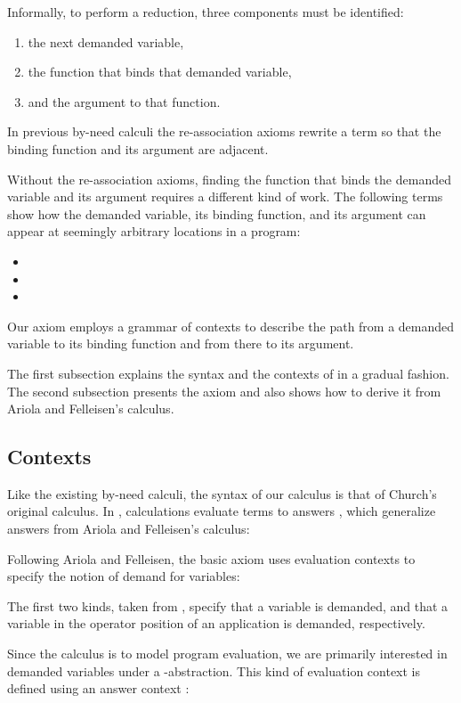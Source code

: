 \documentclass[runningheads,a4paper]{llncs}
\begin{document}
Informally, to perform a reduction, three components must be identified:
\begin{enumerate}
  \item the next demanded variable,
  \item the function that binds that demanded variable,
  \item and the argument to that function.
\end{enumerate}
In previous by-need calculi the re-association axioms rewrite a term so that
 the binding function and its argument are adjacent.
 
Without the re-association axioms, finding the function that binds the
 demanded variable and its argument requires a different kind of work. The
 following terms show how the demanded variable, its binding function, and its
 argument can appear at seemingly arbitrary locations in a program:
\begin{itemize}
\item 
\item 
\item 
\end{itemize}
Our \betaneednr axiom employs a grammar of contexts to describe the path
 from a demanded variable to its binding function and from there to its
 argument.

The first subsection explains the syntax and the contexts of \lneed in a
 gradual fashion. The second subsection presents the \betaneednr axiom and also
 shows how to derive it from Ariola and Felleisen's \laf calculus.




\subsection{Contexts}
\label{subsec:newevalcontexts}

Like the existing by-need calculi, the syntax of our calculus is
 that of Church's original calculus. In \lneed, calculations evaluate terms 
 to answers , which generalize answers from Ariola and Felleisen's
 calculus:


Following Ariola and Felleisen, the basic axiom uses evaluation contexts to
 specify the notion of demand for variables:

 The first two kinds, taken from \laf, specify that a variable is
 demanded, and that a variable in the operator position of an application
 is demanded, respectively.  

Since the calculus is to model program evaluation, we are primarily interested
 in demanded variables under a -abstraction. This kind of evaluation
 context is defined using an answer context :
 
\end{document}
